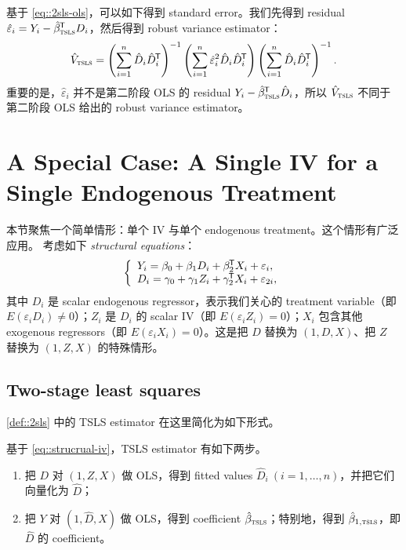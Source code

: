 基于 \cref{eq::2sls-ols}，可以如下得到 standard error。我们先得到 residual $\hat{\varepsilon}_i = Y_i - \hat{\beta}_\textsc{tsls}^{\mkern-1.5mu\mathsf{T}} D_i$，然后得到 robust variance estimator：
$$
\hat{V}_\textsc{tsls} = \left( \sum_{i=1}^n  \hat{D}_i \hat{D}_i^{\mkern-1.5mu\mathsf{T}}  \right)^{-1}
 \left( \sum_{i=1}^n \hat{\varepsilon}_i ^2  \hat{D}_i \hat{D}_i^{\mkern-1.5mu\mathsf{T}}  \right)
\left( \sum_{i=1}^n  \hat{D}_i \hat{D}_i^{\mkern-1.5mu\mathsf{T}}  \right)^{-1} . 
$$
重要的是，$\hat{\varepsilon}_i$ 并不是第二阶段 OLS 的 residual $  Y_i - \hat{\beta}_\textsc{tsls}^{\mkern-1.5mu\mathsf{T}} \hat{D}_i $，所以 $\hat{V}_\textsc{tsls} $ 不同于第二阶段 OLS 给出的 robust variance estimator。 




\section{A Special Case: A Single IV for a Single Endogenous Treatment}


本节聚焦一个简单情形：单个 IV 与单个 endogenous treatment。这个情形有广泛应用。
考虑如下 {\it structural equations}：
\begin{eqnarray}
\label{eq::strucrual-iv}
\left\{
\begin{array}{l}
Y_i = \beta_0 + \beta_1 D_i + \beta_2^{\mkern-1.5mu\mathsf{T}} X_i + \varepsilon_{i},\\
D_i = \gamma_0 + \gamma_1 Z_i + \gamma_2 ^{\mkern-1.5mu\mathsf{T}} X_i + \varepsilon_{2i},
\end{array}
\right.
\end{eqnarray}
其中 $D_i$ 是 scalar endogenous regressor，表示我们关心的 treatment variable（即 $E(\varepsilon_{i} D_i) \neq 0$）；$Z_i$ 是 $D_i$ 的 scalar IV（即 $E(\varepsilon_{i} Z_i) = 0$）；$X_i$ 包含其他 exogenous regressors（即 $E(\varepsilon_{i} X_i) = 0$）。这是把 $D$ 替换为 $(1, D, X)$、把 $Z$ 替换为 $(1, Z, X)$ 的特殊情形。 



\subsection{Two-stage least squares}

\cref{def::2sls} 中的 TSLS estimator 在这里简化为如下形式。 

\begin{definition}
\label{def::tsls-single}
基于 \cref{eq::strucrual-iv}，TSLS estimator 有如下两步。
\begin{enumerate}
\item
把 $D$ 对 $(1, Z,X)$ 做 OLS，得到 fitted values $\hat{D}_i\ (i=1,\ldots, n)$，并把它们向量化为 $\hat{D}$；

\item 
把 $Y$ 对 $(1, \hat{D}, X)$ 做 OLS，得到 coefficient $\hat{\beta}_\textsc{tsls}$；特别地，得到 $\hat{\beta}_{1,\textsc{tsls}}$，即 $\hat{D}$ 的 coefficient。 
\end{enumerate}
\end{definition}



